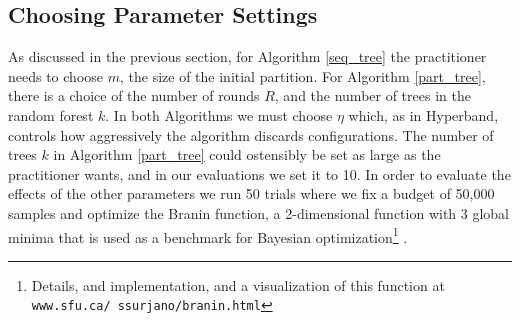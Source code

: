 \documentclass[11pt]{article}
\begin{document}
\subsection{Choosing Parameter Settings} \label{sec:params}
As discussed in the previous section, for Algorithm \ref{seq_tree} the practitioner needs to choose $m$, the size of the initial partition. For Algorithm \ref{part_tree}, there is a choice of the number of rounds $R$, and the number of trees in the random forest $k$. In both Algorithms we must choose $\eta$ which, as in Hyperband, controls how aggressively the algorithm discards configurations. The number of trees $k$ in Algorithm \ref{part_tree} could ostensibly be set as large as the practitioner wants, and in our evaluations we set it to 10. In order to evaluate the effects of the other parameters we run 50 trials where we fix a budget of 50,000 samples and optimize the Branin function, a 2-dimensional function with 3 global minima that is used as a benchmark for Bayesian optimization\footnote{Details, and implementation, and a visualization of this function at \texttt{www.sfu.ca/~ssurjano/branin.html}} \cite{Snoek2012, Jones2001}. 
\end{document}
